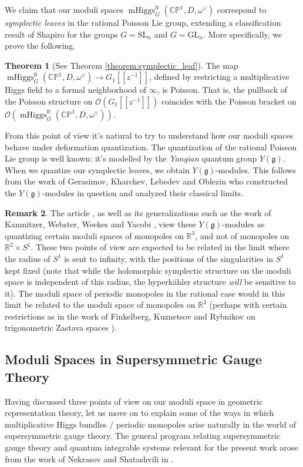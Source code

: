 \documentclass[11pt, oneside, reqno]{amsart}
\theoremstyle{definition} \newtheorem{definition}{Definition}[section]
\newtheorem{theorem}[definition]{Theorem}
\theoremstyle{definition} \newtheorem{remark}[definition]{Remark}
\theoremstyle{definition} \newtheorem{remarks}[definition]{Remarks}
\theoremstyle{definition} \newtheorem{question}[definition]{Question}
\theoremstyle{definition} \newtheorem*{note}{Note}
\theoremstyle{definition} \newtheorem{example}[definition]{Example}
\theoremstyle{definition} \newtheorem{examples}[definition]{Examples}
\renewcommand{\gg}{\mathfrak{g}}
\newcommand{\bb}[1]{\mathbb{#1}}
\newcommand{\RR}{\mathbb{R}}
\newcommand{\OO}{\mathcal{O}}
\newcommand{\SL}{\mathrm{SL}}
\newcommand{\GL}{\mathrm{GL}}
\DeclareMathOperator{\mhiggs}{mHiggs}
\newcommand{\fr}{\mathrm{fr}}
\begin{document}
We claim that our moduli spaces $\mhiggs_G^{\text{fr}}(\bb{CP}^1,D,\omega^\vee)$ correspond to \emph{symplectic leaves} in the rational Poisson Lie group, extending a classification result of Shapiro \cite{Shapiro} for the groups $G = \SL_n$ and $G = \GL_n$.  More specifically, we prove the following.
\begin{theorem}[See Theorem \ref{theorem:symplectic_leaf}]
The map $\mhiggs^\fr_G(\bb{CP}^1,D,\omega^\vee) \to G_1[[z^{-1}]]$, defined by restricting a multiplicative Higgs field to a formal neighborhood of $\infty$, is Poisson.  That is, the pullback of the Poisson structure on $\OO(G_1[[z^{-1}]])$ coincides with the Poisson bracket on $\OO(\mhiggs^\fr_G(\bb{CP}^1,D,\omega^\vee))$. 
\end{theorem}

From this point of view it's natural to try to understand how our moduli spaces behave under deformation quantization.  The quantization of the rational Poisson Lie group is well known: it's modelled by the \emph{Yangian} quantum group $Y(\gg)$.  When we quantize our symplectic leaves, we obtain $Y(\gg)$-modules.  This follows from the work of Gerasimov, Kharchev, Lebedev and Oblezin \cite{GKLO} who constructed the $Y(\gg)$-modules in question and analyzed their classical limits.

\begin{remark}
The article \cite{GKLO}, as well as its generalizations such as the work of Kamnitzer, Webster, Weekes and Yacobi \cite{KWWY}, view these $Y(\gg)$-modules as quantizing certain moduli spaces of monopoles on $\RR^3$, and not of monopoles on $\RR^2 \times S^1$.  These two points of view are expected to be related in the limit where the radius of $S^1$ is sent to infinity, with the positions of the singularities in $S^1$ kept fixed (note that while the holomorphic symplectic structure on the moduli space is independent of this radius, the hyperk\"ahler structure \emph{will} be sensitive to it).  The moduli space of periodic monopoles in the rational case would in this limit be related to the moduli space of monopoles on $\RR^3$ (perhaps with certain restrictions as in the work of Finkelberg, Kuznetsov and Rybnikov on trigonometric Zastava spaces \cite{FKR}).
\end{remark}

\subsection{Moduli Spaces in Supersymmetric Gauge Theory} \label{intro_gauge_section}
Having discussed three points of view on our moduli space in geometric representation theory, let us move on to explain some of the ways in which multiplicative Higgs bundles / periodic monopoles arise naturally in the world of supersymmetric gauge theory.  The general program relating supersymmetric gauge theory and quantum integrable systems relevant for the present work arose from the work of Nekrasov and Shatashvili in \cite{Nekrasov:2009ui,Nekrasov:2009rc}.
\end{document}
